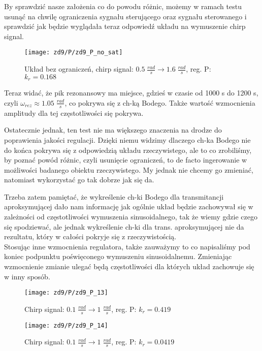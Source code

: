 \documentclass[11 pt]{article}
\begin{document}
By sprawdzić nasze założenia co do powodu różnic, możemy w ramach testu usunąć na chwilę ograniczenia sygnału sterującego oraz sygnału sterowanego i sprawdzić jak będzie wyglądała teraz odpowiedź układu na wymuszenie chirp signal.

\newpage

\begin{figure}[h!]
	\centerline{
	\texttt{[image: zd9/P/zd9\_P\_no\_sat]}
	}
	\caption{Układ bez ograniczeń, chirp signal: $0.5 \; \frac{rad}{s} \rightarrow 1.6 \; \frac{rad}{s}$, reg. P: $k_r = 0.168$}
\end{figure}

Teraz widać, że pik rezonansowy ma miejsce, gdzieś w czasie od 1000 s do 1200 s, czyli $\omega_{rez} \approx 1.05 \; \frac{rad}{s}$, co pokrywa się z ch-ką Bodego. Także wartość wzmocnienia amplitudy dla tej częstotliwości się pokrywa.

Ostatecznie jednak, ten test nie ma większego znaczenia na drodze do poprawienia jakości regulacji. Dzięki niemu widzimy dlaczego ch-ka Bodego nie do końca pokrywa się z odpowiedzią układu rzeczywistego, ale to co zrobiliśmy, by poznać powód różnic, czyli usunięcie ograniczeń, to de facto ingerowanie w możliwości badanego obiektu rzeczywistego. My jednak nie chcemy go zmieniać, natomiast wykorzystać go tak dobrze jak się da.

Trzeba zatem pamiętać, że wykreślenie ch-ki Bodego dla transmitancji aproksymującej dało nam informację jak ogólnie układ będzie zachowywał się w zależności od częstotliwości wymuszenia sinusoidalnego, tak że wiemy gdzie czego się spodziewać, ale jednak wykreślenie ch-ki dla trans. aproksymującej nie da rezultatu, który w całości pokryje się z rzeczywistością.\\

Stosując inne wzmocnienia regulatora, także zauważymy to co napisaliśmy pod koniec podpunktu poświęconego wymuszeniu sinusoidalnemu. Zmieniając wzmocnienie zmianie ulegać będą częstotliwości dla których układ zachowuje się w inny sposób.

\begin{figure}[h!]
	\centerline{
	\texttt{[image: zd9/P/zd9\_P\_13]}
	}
	\caption{Chirp signal: $0.1 \; \frac{rad}{s} \rightarrow 1 \; \frac{rad}{s}$, reg. P: $k_r = 0.419$}
\end{figure}

\newpage

\begin{figure}[h!]
	\centerline{
	\texttt{[image: zd9/P/zd9\_P\_14]}
	}
	\caption{Chirp signal: $0.1 \; \frac{rad}{s} \rightarrow 1 \; \frac{rad}{s}$, reg. P: $k_r = 0.0419$}
\end{figure}
\end{document}
